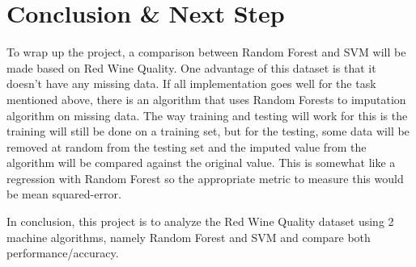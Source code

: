 \documentclass[13pt,a4paper,titlepage]{article}
\begin{document}
	\section*{Conclusion \& Next Step}
	To wrap up the project, a comparison between Random Forest and SVM will be made based on Red Wine Quality. One advantage of this dataset is that it doesn't have any missing data. If all implementation goes well for the task mentioned above, there is an algorithm that uses Random Forests to imputation algorithm on missing data. The way training and testing will work for this is the training will still be done on a training set, but for the testing, some data will be removed at random from the testing set and the imputed value from the algorithm will be compared against the original value. This is somewhat like a regression with Random Forest so the appropriate metric to measure this would be mean squared-error.
	
	In conclusion, this project is to analyze the Red Wine Quality dataset using 2 machine algorithms, namely Random Forest and SVM and compare both performance/accuracy.  
\end{document}
